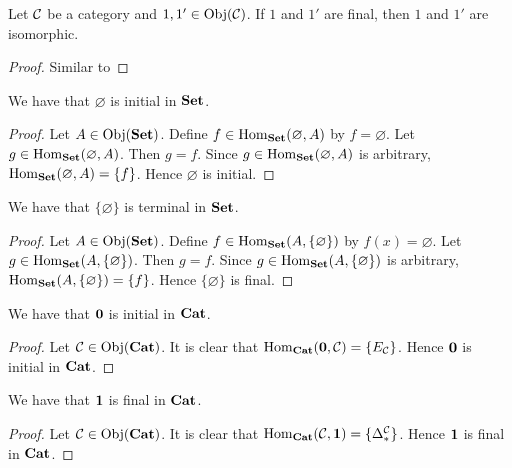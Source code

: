 \documentclass{book}
\begin{document}
	\begin{ex} 
		Let $\MC$ be a category and $1, 1' \in \Obj(\MC)$. If $1$ and $1'$ are final, then $1$ and $1'$ are isomorphic.
	\end{ex}
	
	\begin{proof}
		Similar to 
	\end{proof}
	
	\begin{ex} 
		We have that $\varnothing$ is initial in $\Set$. 
	\end{ex}
	
	\begin{proof}
		Let $A \in \Obj(\Set)$. Define $f \in \Hom_{\Set}(\varnothing, A)$ by $f = \varnothing$. Let $g \in \Hom_{\Set}(\varnothing, A)$. Then $g = f$. Since $g \in \Hom_{\Set}(\varnothing, A)$ is arbitrary, $\Hom_{\Set}(\varnothing, A) = \{f\}$. Hence $\varnothing$ is initial.
	\end{proof}

	\begin{ex} 
		We have that $ \{\varnothing\}$  is terminal in $\Set$. 
	\end{ex}
	
	\begin{proof}
		Let $A \in \Obj(\Set)$. Define $f \in \Hom_{\Set}(A, \{\varnothing\})$ by $f(x) = \varnothing$. Let $g \in \Hom_{\Set}(A, \{\varnothing\})$. Then $g = f$. Since $g \in \Hom_{\Set}(A, \{\varnothing\})$ is arbitrary, $\Hom_{\Set}(A, \{\varnothing\}) = \{f\}$. Hence $\{\varnothing\}$ is final.
	\end{proof}
	
	\begin{ex} 
		We have that $\0$ is initial in $\Cat$. 
	\end{ex}

	\begin{proof}
		Let $\MC \in \Obj(\Cat)$. It is clear that $\Hom_{\Cat}(\0, \MC) = \{E_\MC\}$. Hence $\0$ is initial in $\Cat$.
	\end{proof}

	\begin{ex} 
		We have that $\1$ is final in $\Cat$. 
	\end{ex}
	
	\begin{proof}
		Let $\MC \in \Obj(\Cat)$. It is clear that $\Hom_{\Cat}(\MC, \1) = \{ \Del^{\MC}_* \}$. Hence $\1$ is final in $\Cat$.
	\end{proof}
\end{document}
